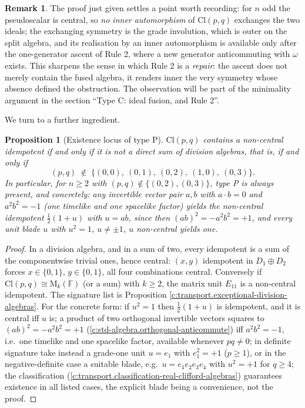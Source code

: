 \documentclass[11pt]{article}
\newtheorem{proposition}[theorem]{Proposition}
\theoremstyle{definition}
\newtheorem{remark}[theorem]{Remark}
\theoremstyle{plain}
\providecommand{\Cl}{}\renewcommand{\Cl}{\mathrm{Cl}}
\providecommand{\Mat}{}\renewcommand{\Mat}{\mathrm{M}}
\begin{document}
\begin{remark}\label{c:note.transport.typec-depth}
The proof just given settles a point worth recording: for $n$ odd the pseudoscalar is central, so \emph{no inner automorphism} of $\Cl(p,q)$ exchanges the two ideals; the exchanging symmetry is the grade involution, which is outer on the split algebra, and its realisation by an inner automorphism is available only after the one-generator ascent of Rule 2, where a new generator anticommuting with $\omega$ exists. This sharpens the sense in which Rule 2 is a \emph{repair}: the ascent does not merely contain the fused algebra, it renders inner the very symmetry whose absence defined the obstruction. The observation will be part of the minimality argument in the section ``Type C: ideal fusion, and Rule 2''.
\end{remark}

We turn to a further ingredient.

\begin{proposition}[Existence locus of type P]\label{c:transport.existence-locus-type-p}
$\Cl(p,q)$ contains a non-central idempotent if and only if it is not a direct sum of division algebras, that is, if and only if
\[
(p,q) \;\notin\; \{(0,0),\ (0,1),\ (0,2),\ (1,0),\ (0,3)\} .
\]
In particular, for $n \geq 2$ with $(p,q) \notin \{(0,2), (0,3)\}$, type P is always present, and concretely: any invertible vector pair $a, b$ with $a \cdot b = 0$ and $a^2 b^2 = -1$ (one timelike and one spacelike factor) yields the non-central idempotent $\tfrac12(1 + u)$ with $u = ab$, since then $(ab)^2 = -a^2b^2 = +1$, and every unit blade $u$ with $u^2 = 1$, $u \neq \pm 1$, $u$ non-central yields one.
\end{proposition}
\begin{proof}
In a division algebra, and in a sum of two, every idempotent is a sum of the componentwise trivial ones, hence central: $(x,y)$ idempotent in $D_1 \oplus D_2$ forces $x \in \{0,1\}$, $y \in \{0,1\}$, all four combinations central. Conversely if $\Cl(p,q) \cong \Mat_k(\mathbb{F})$ (or a sum) with $k \geq 2$, the matrix unit $E_{11}$ is a non-central idempotent. The signature list is Proposition \ref{c:transport.exceptional-division-algebras}. For the concrete form: if $u^2 = 1$ then $\tfrac12(1+u)$ is idempotent, and it is central iff $u$ is; a product of two orthogonal invertible vectors squares to $(ab)^2 = -a^2b^2 = +1$ (\ref{c:std-algebra.orthogonal-anticommute}) iff $a^2 b^2 = -1$, i.e.\ one timelike and one spacelike factor, available whenever $pq \neq 0$; in definite signature take instead a grade-one unit $u = e_1$ with $e_1^2 = +1$ ($p \geq 1$), or in the negative-definite case a suitable blade, e.g.\ $u = e_1e_2e_3e_4$ with $u^2 = +1$ for $q \geq 4$; the classification (\ref{c:transport.classification-real-clifford-algebras}) guarantees existence in all listed cases, the explicit blade being a convenience, not the proof.

\end{proof}
\end{document}
